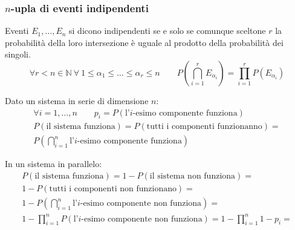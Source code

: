 \subsubsection{\texorpdfstring{$n$}{n}-upla di eventi indipendenti}
\begin{defin}
	Eventi $E_1,\dots,E_n$ si dicono indipendenti se e solo se comunque sceltone $r$ la probabilità della loro intersezione è uguale al prodotto della probabilità dei singoli.
	\begin{equation*}
		\forall r<n\in\mathbb{N}~\forall~1\leq \alpha_1 \leq\dots\leq\alpha_r\leq n \qquad P \left(\bigcap_{i=1}^r E_{\alpha_i} \right)=\prod_{i=1}^r P(E_{\alpha_i})
	\end{equation*}
\end{defin}

\begin{examp}
	Dato un sistema in serie di dimensione $n$:
	\begin{gather*}
		\forall i=1,\dots,n \qquad p_i=P(\text{l'}i\text{-esimo componente funziona}) \\[1ex]
		P(\text{il sistema funziona}) = P(\text{tutti i componenti funzionanno}) = \\
		P\left(\bigcap_{i=1}^n \text{l'}i\text{-esimo componente funziona}\right)
	\end{gather*}

	In un sistema in parallelo:
	\begin{gather*}
		P(\text{il sistema funziona}) = 1-P(\text{il sistema non funziona}) = \\[1ex]
		1-P(\text{tutti i componenti non funzionano}) = \\[1ex]
		1- P\left(\bigcap_{i=1}^n \text{l'}i\text{-esimo componente non funziona}\right) = \\[1ex]
		1-\prod_{i=1}^n P(\text{l'}i\text{-esimo componente non funziona}) =
		1-\prod_{i=1}^n 1-p_i =
	\end{gather*}
\end{examp}
